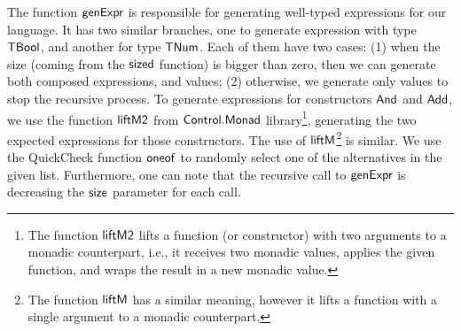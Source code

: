 \documentclass[tese,capa,english]{texufpel}
\newcommand{\V}[1]{\black{\mathsf{#1}}}
\newcommand{\HC}[1]{\green{\mathsf{#1}}}
\newcommand{\HFun}[1]{\blue{\mathsf{#1}}}
\begin{document}
The function \ensuremath{\HFun{genExpr}} is responsible for generating well-typed expressions for our language. It has two similar branches, one to generate expression with type \ensuremath{\HC{TBool}}, and another for type \ensuremath{\HC{TNum}}. Each of them have two cases: (1) when the size (coming from the \ensuremath{\HFun{sized}} function) is bigger than zero, then we can generate both composed expressions, and values; (2) otherwise, we generate only values to stop the recursive process. To generate expressions for constructors \ensuremath{\HC{And}} and \ensuremath{\HC{Add}}, we use the function \ensuremath{\HFun{liftM2}} from \ensuremath{\V{Control.Monad}} library\footnote{The function \ensuremath{\HFun{liftM2}} lifts a function (or constructor) with two arguments to a monadic counterpart, i.e., it receives two monadic values, applies the given function, and wraps the result in a new monadic value.}, generating the two expected expressions for those constructors. The use of \ensuremath{\HFun{liftM}}\footnote{The function \ensuremath{\HFun{liftM}} has a similar meaning, however it lifts a function with a single argument to a monadic counterpart.} is similar. We use the QuickCheck function \ensuremath{\HFun{oneof}} to randomly select one of the alternatives in the given list. Furthermore, one can note that the recursive call to \ensuremath{\HFun{genExpr}} is decreasing the \ensuremath{\V{size}} parameter for each call.
\end{document}
